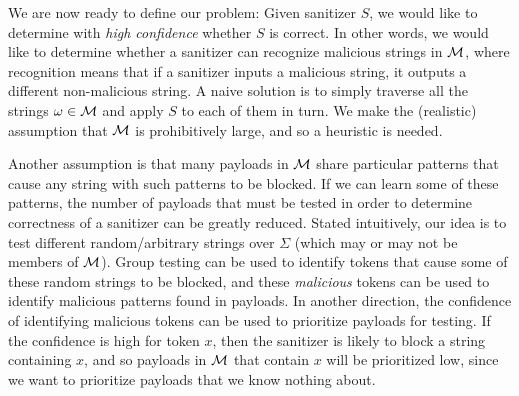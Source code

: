 We are now ready to define our problem: Given sanitizer $S$, we would like to determine with \emph{high confidence} whether $S$ is correct. In other words, we would like to determine whether a sanitizer can recognize malicious strings in $\cal{M}$, where recognition means that if a sanitizer inputs a malicious string, it outputs a different non-malicious string. A naive solution is to simply traverse all the strings $\omega \in {\cal M}$ and apply $S$ to each of them in turn. We make the (realistic) assumption that ${\cal M}$ is prohibitively large, and so a heuristic is needed.

Another assumption is that many payloads in $\cal{M}$ share particular patterns that cause any string with such patterns to be blocked. If we can learn some of these patterns, the number of payloads that must be tested in order to determine correctness of a sanitizer can be greatly reduced. Stated intuitively, our idea is to test different random/arbitrary strings over $\Sigma$ (which may or may not be members of ${\cal M}$). Group testing can be used to identify tokens that cause some of these random strings to be blocked, and these \emph{malicious} tokens can be used to identify malicious patterns found in payloads. In another direction, the confidence of identifying malicious tokens can be used to prioritize payloads for testing.
If the confidence is high for token $x$, then the sanitizer is likely to block a string containing $x$, and so payloads in ${\cal M}$ that contain $x$ will be prioritized low, since we want to prioritize payloads that we know nothing about. 


